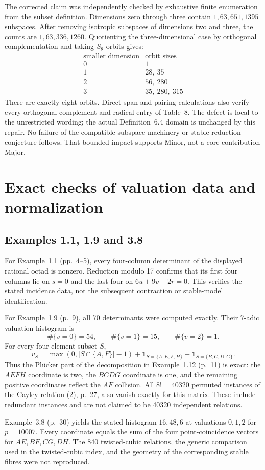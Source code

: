 \documentclass[10pt]{article}
\begin{document}
The corrected claim was independently checked by exhaustive finite enumeration from the subset definition. Dimensions zero through three contain \(1,63,651,1395\) subspaces. After removing isotropic subspaces of dimensions two and three, the counts are \(1,63,336,1260\). Quotienting the three-dimensional case by orthogonal complementation and taking \(S_8\)-orbits gives: \[\begin{array}{c|l}
\text{smaller dimension}&\text{orbit sizes}\\\hline
0&1\\
1&28,\ 35\\
2&56,\ 280\\
3&35,\ 280,\ 315
\end{array}\] There are exactly eight orbits. Direct span and pairing calculations also verify every orthogonal-complement and radical entry of Table 8. The defect is local to the unrestricted wording; the actual Definition 6.4 domain is unchanged by this repair. No failure of the compatible-subspace machinery or stable-reduction conjecture follows. That bounded impact supports Minor, not a core-contribution Major.\par
\section*{Exact checks of valuation data and normalization}
\subsection*{Examples 1.1, 1.9 and 3.8}
For Example 1.1 (pp. 4–5), every four-column determinant of the displayed rational octad is nonzero. Reduction modulo 17 confirms that its first four columns lie on \(s=0\) and the last four on \(6u+9v+2r=0\). This verifies the stated incidence data, not the subsequent contraction or stable-model identification.\par
For Example 1.9 (p. 9), all 70 determinants were computed exactly. Their 7-adic valuation histogram is \[\#\{v=0\}=54,\qquad\#\{v=1\}=15,\qquad\#\{v=2\}=1.\] For every four-element subset \(S\), \[v_S=\max(0,|S\cap\{A,F\}|-1)
      +\mathbf1_{S=\{A,E,F,H\}}
      +\mathbf1_{S=\{B,C,D,G\}}.\] Thus the Plücker part of the decomposition in Example 1.12 (p. 11) is exact: the \(AEFH\) coordinate is two, the \(BCDG\) coordinate is one, and the remaining positive coordinates reflect the \(AF\) collision. All \(8!=40320\) permuted instances of the Cayley relation (2), p. 27, also vanish exactly for this matrix. These include redundant instances and are not claimed to be 40320 independent relations.\par
Example 3.8 (p. 30) yields the stated histogram \(16,48,6\) at valuations \(0,1,2\) for \(p=10007\). Every coordinate equals the sum of the four point-coincidence vectors for \(AE,BF,CG,DH\). The 840 twisted-cubic relations, the generic comparison used in the twisted-cubic index, and the geometry of the corresponding stable fibres were not reproduced.\par
\end{document}
